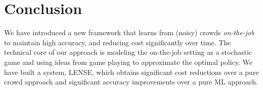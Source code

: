 \section{Conclusion}
\label{sec:conclusion}

We have introduced a new framework that learns from (noisy) crowds \emph{on-the-job}
to maintain high accuracy, and reducing cost significantly over time.
The technical core of our approach is modeling the on-the-job setting
as a stochastic game and using ideas from game playing to approximate the optimal policy.
We have built a system, LENSE, %
which obtains significant cost reductions over a pure crowd approach
and significant accuracy improvements over a pure ML approach.


